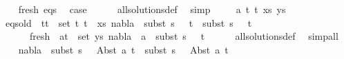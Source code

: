 \begin{isabellebody}
\ \ \isamarkupfalse%
\ fresh\ eqs\ \isamarkupfalse%
\ {\isacharquery}{\kern0pt}case\isanewline
\ \ \ \ \isamarkupfalse%
\ all{\isacharunderscore}{\kern0pt}solutions{\isacharunderscore}{\kern0pt}def\ \isamarkupfalse%
\ simp\isanewline
{}\isamarkupfalse%
\isanewline
\ \ \isamarkupfalse%
\ {\isacharparenleft}{\kern0pt}{}\ a\ t{}\ t{}\ xs\ ys{\isacharparenright}{\kern0pt}\isanewline
\ \ \isamarkupfalse%
\ eqs{\isacharunderscore}{\kern0pt}old{\isacharcolon}{\kern0pt}\ {\isachardoublequoteopen}{\isasymforall}\ {\isacharparenleft}{\kern0pt}t{}{\isacharcomma}{\kern0pt}t{}{\isacharparenright}{\kern0pt}\ {\isasymin}\ set\ {\isacharparenleft}{\kern0pt}{\isacharparenleft}{\kern0pt}t{}{\isacharcomma}{\kern0pt}\ t{}{\isacharparenright}{\kern0pt}\ {\isacharhash}{\kern0pt}\ xs{\isacharparenright}{\kern0pt}{\isachardot}{\kern0pt}\ nabla{}\ {\isasymturnstile}\ subst\ {\isacharparenleft}{\kern0pt}s{}\ {\isasymbullet}\ {\isacharbrackleft}{\kern0pt}{\isacharbrackright}{\kern0pt}{\isacharparenright}{\kern0pt}\ t{}\ {\isasymapprox}\ subst\ {\isacharparenleft}{\kern0pt}s{}\ {\isasymbullet}\ {\isacharbrackleft}{\kern0pt}{\isacharbrackright}{\kern0pt}{\isacharparenright}{\kern0pt}\ t{}{\isachardoublequoteclose}\ \isanewline
\ \ \ \ \ \ fresh{\isacharcolon}{\kern0pt}\ {\isachardoublequoteopen}{\isasymforall}\ {\isacharparenleft}{\kern0pt}a{\isacharcomma}{\kern0pt}t{\isacharparenright}{\kern0pt}\ {\isasymin}\ set\ ys{\isachardot}{\kern0pt}\ nabla{}\ {\isasymturnstile}\ a\ {\isasymsharp}\ subst\ {\isacharparenleft}{\kern0pt}s{}\ {\isasymbullet}\ {\isacharbrackleft}{\kern0pt}{\isacharbrackright}{\kern0pt}{\isacharparenright}{\kern0pt}\ t{\isachardoublequoteclose}\isanewline
\ \ \ \ \isamarkupfalse%
\ all{\isacharunderscore}{\kern0pt}solutions{\isacharunderscore}{\kern0pt}def\ \isamarkupfalse%
\ simp{\isacharunderscore}{\kern0pt}all\isanewline
\ \ \isamarkupfalse%
\ {\isachardoublequoteopen}nabla{}\ {\isasymturnstile}\ subst\ {\isacharparenleft}{\kern0pt}s{}\ {\isasymbullet}\ {\isacharbrackleft}{\kern0pt}{\isacharbrackright}{\kern0pt}{\isacharparenright}{\kern0pt}\ {\isacharparenleft}{\kern0pt}Abst\ a\ t{}{\isacharparenright}{\kern0pt}\ {\isasymapprox}\ subst\ {\isacharparenleft}{\kern0pt}s{}\ {\isasymbullet}\ {\isacharbrackleft}{\kern0pt}{\isacharbrackright}{\kern0pt}{\isacharparenright}{\kern0pt}\ {\isacharparenleft}{\kern0pt}Abst\ a\ t{}{\isacharparenright}{\kern0pt}{\isachardoublequoteclose}\isanewline

\end{isabellebody}
